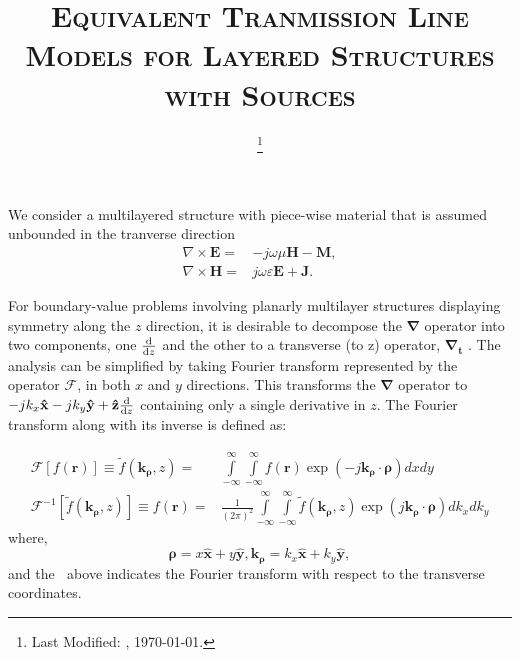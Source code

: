 \documentclass[11pt]{article}
\renewcommand{\v}[1]{\mathbf{#1}} %
\newcommand{\ti}[1]{\tilde{#1}} %
\renewcommand{\O}{\omega}  %
\renewcommand{\u}{\mu}  %
\newcommand{\x}{\times}  %
\renewcommand{\inf}{\infty}  %
\newcommand{\infint}{\int\limits_{-\inf}^\inf} %
\begin{document}
  \title{\textsc{Equivalent Tranmission Line Models for Layered Structures with Sources}\\}
  \date{\footnote{Last Modified: \currenttime, \today.}}
  \maketitle
  We consider a multilayered structure with piece-wise material that is assumed unbounded in the tranverse direction
  \begin{subequations}
    \begin{align}
      \nabla\x{\v E} ={}& -j \O \u \v{H} -\v{M},
      \label{eq:E}\\
      \nabla\x{\v H} ={}& j \O \varepsilon \v{E} + \v{J}.
      \label{eq:H}
    \end{align}
    \label{eq:MaxE}
  \end{subequations}

  For boundary-value problems involving planarly multilayer structures displaying symmetry along the $z$ direction, it is desirable to decompose the $\v{\nabla}$ operator into two components, one $\dv{}{z}$ and the other to a transverse (to z) operator, $\v{\nabla_t}$ \cite[p. 64]{felsen1994radiation}. The analysis can be simplified by taking Fourier transform represented by the operator $\mathcal{F}$, in both $x$ and $y$ directions. This transforms the $\v{\nabla}$ operator to $-j k_x \v{\hat{x}} - j k_y \v{\hat{y}} + \v{\hat{z}}\dv{}{z}$ containing only a single derivative in $z$.
  The Fourier transform along with its inverse is defined as:

  \begin{subequations}
    \begin{align}
      \mathcal{F}[f(\v{r})] \equiv \ti{f}(\v{k_{\rho}},z) ={}& \infint \infint
      f(\v{r}) \exp(-j \v{k_{\rho}} \cdot \v{\rho}) dx dy
      \label{eq:Fourier}\\
      \mathcal{F}^{-1}[\ti{f}(\v{k_{\rho}},z)] \equiv f(\v{r}) ={}& \frac{1}{(2\pi)^2} \infint \infint \ti{f}(\v{k_{\rho}},z)
      \exp(j \v{k_{\rho}} \cdot \v{\rho}) dk_x dk_y
      \label{eq:IFourier}
    \end{align}
    \label{eq:FT}
  \end{subequations}
  where,
  \begin{equation}
    \v{\rho} = x\v{\hat{x}} + y\v{\hat{y}},
    \v{k_{\rho}} = k_x\v{\hat{x}} + k_y\v{\hat{y}},
  \end{equation}
  and the $~$ above indicates the Fourier transform with respect to the transverse coordinates.
\end{document}
